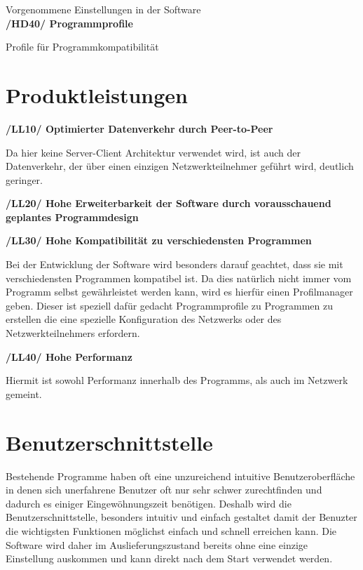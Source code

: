\documentclass[a4paper,12pt]{scrreprt}
\begin{document}
	Vorgenommene Einstellungen in der Software\\
	\textbf {/HD40/ Programmprofile}
	
	Profile für Programmkompatibilität

\chapter{Produktleistungen}
\textbf{/LL10/ Optimierter Datenverkehr durch Peer-to-Peer}
	
	Da hier keine Server-Client Architektur verwendet wird, ist auch der Datenverkehr, der über einen einzigen Netzwerkteilnehmer geführt wird, deutlich geringer.
	
\textbf{/LL20/ Hohe Erweiterbarkeit der Software durch vorausschauend geplantes Programmdesign}
	
\textbf{/LL30/ Hohe Kompatibilität zu verschiedensten Programmen}
	
	Bei der Entwicklung der Software wird besonders darauf geachtet, dass sie mit verschiedensten Programmen kompatibel ist. Da dies natürlich nicht immer vom Programm selbst gewährleistet werden kann, wird es hierfür einen Profilmanager geben. Dieser ist speziell dafür gedacht Programmprofile zu Programmen zu erstellen die eine spezielle Konfiguration des Netzwerks oder des Netzwerkteilnehmers erfordern.
	
\textbf{/LL40/ Hohe Performanz}
	
	Hiermit ist sowohl Performanz innerhalb des Programms, als auch im Netzwerk gemeint.
	
	
	
	
\chapter{Benutzerschnittstelle}
	Bestehende Programme haben oft eine unzureichend intuitive Benutzeroberfläche in denen sich unerfahrene Benutzer oft nur sehr schwer zurechtfinden und dadurch es einiger Eingewöhnungszeit benötigen. Deshalb wird die Benutzerschnittstelle, besonders intuitiv und einfach gestaltet damit der Benuzter die wichtigsten Funktionen möglichst einfach und schnell erreichen kann. Die Software wird daher im Auslieferungszustand bereits ohne eine einzige Einstellung auskommen und kann direkt nach dem Start verwendet werden.
	
	
\end{document}

